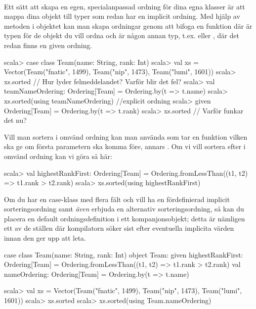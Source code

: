 
\QUESTBEGIN

\Task \label{task:custom-ordering} \what~

\Subtask Ett sätt att skapa en egen, specialanpassad ordning för dina egna klasser är att mappa dina objekt till typer som redan har en implicit ordning. Med hjälp av metoden  i objektet  kan man skapa ordningar genom att bifoga en funktion  där  är typen för de objekt du vill ordna och  är någon annan typ, t.ex.  eller , där det redan finns en given ordning.
\begin{REPL}
scala> case class Team(name: String, rank: Int)
scala> val xs =
         Vector(Team("fnatic", 1499), Team("nip", 1473), Team("lumi", 1601))
scala> xs.sorted  // Hur lyder felmeddelandet? Varför blir det fel?
scala> val teamNameOrdering: Ordering[Team] = Ordering.by(t => t.name)
scala> xs.sorted(using teamNameOrdering)   //explicit ordning
scala> given Ordering[Team] = Ordering.by(t => t.rank)
scala> xs.sorted   // Varför funkar det nu?
\end{REPL}

\Subtask Vill man sortera i omvänd ordning kan man använda
 som tar en funktion  vilken ska ge  om första parametern ska komma före, annars . Om vi vill sortera efter  i omvänd ordning kan vi göra så här:
\begin{REPL}
scala> val highestRankFirst: Ordering[Team] =
         Ordering.fromLessThan((t1, t2) => t1.rank > t2.rank)
scala> xs.sorted(using highestRankFirst)
\end{REPL}

\Subtask Om du har en case-klass med flera fält och vill ha en fördefinierad implicit sorteringsordning samt \emph{även} erbjuda en alternativ sorteringsordning, så kan du placera en default ordningsdefinition i ett kompanjonsobjekt; detta är nämligen ett av de ställen där kompilatorn söker sist efter eventuella implicita värden innan den ger upp att leta.
\begin{Code}
case class Team(name: String, rank: Int)
object Team:
  given highestRankFirst: Ordering[Team] = 
    Ordering.fromLessThan((t1, t2) => t1.rank > t2.rank)
  val nameOrdering: Ordering[Team] = Ordering.by(t => t.name)
\end{Code}
\begin{REPL}
scala> val xs =
         Vector(Team("fnatic", 1499), Team("nip", 1473), Team("lumi", 1601))
scala> xs.sorted
scala> xs.sorted(using Team.nameOrdering)
\end{REPL}



